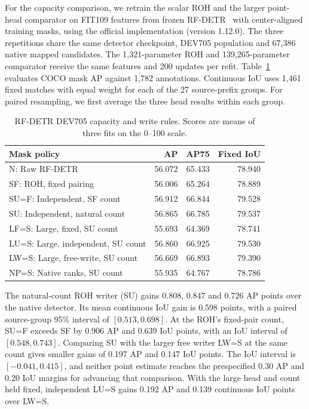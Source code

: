 \documentclass[journal]{IEEEtran}
\begin{document}
For the capacity comparison, we retrain the scalar ROH and the larger point-head comparator on FIT109 features from frozen RF-DETR~\cite{rfdetr} with center-aligned training masks, using the official implementation (version 1.12.0). The three repetitions share the same detector checkpoint, DEV705 population and 67,386 native mapped candidates. The 1,321-parameter ROH and 139,265-parameter comparator receive the same features and 200 updates per refit. Table~\ref{tab:rfdetr} evaluates COCO mask AP against 1,782 annotations. Continuous IoU uses 1,461 fixed matches with equal weight for each of the 27 source-prefix groups. For paired resampling, we first average the three head results within each group.

\begin{table}[t]
\centering
\caption{RF-DETR DEV705 capacity and write rules. Scores are means of three fits on the 0--100 scale.}
\label{tab:rfdetr}
\footnotesize
\begin{tabular}{@{}lrrr@{}}
\toprule
Mask policy & AP & AP75 & Fixed IoU\\
\midrule
N: Raw RF-DETR & 56.072 & 65.433 & 78.940\\
SF: ROH, fixed pairing & 56.006 & 65.264 & 78.889\\
SU=F: Independent, SF count & 56.912 & 66.844 & 79.528\\
SU: Independent, natural count & 56.865 & 66.785 & 79.537\\
LF=S: Large, fixed, SU count & 55.693 & 64.369 & 78.741\\
LU=S: Large, independent, SU count & 56.860 & 66.925 & 79.530\\
LW=S: Large, free-write, SU count & 56.669 & 66.893 & 79.390\\
NP=S: Native ranks, SU count & 55.935 & 64.767 & 78.786\\
\bottomrule
\end{tabular}
\end{table}

The natural-count ROH writer (SU) gains 0.808, 0.847 and 0.726 AP points over the native detector. Its mean continuous IoU gain is 0.598 points, with a paired source-group 95\% interval of \([0.513,0.698]\). At the ROH's fixed-pair count, SU=F exceeds SF by 0.906 AP and 0.639 IoU points, with an IoU interval of \([0.548,0.743]\). Comparing SU with the larger free writer LW=S at the same count gives smaller gains of 0.197 AP and 0.147 IoU points. The IoU interval is \([-0.041,0.415]\), and neither point estimate reaches the prespecified 0.30 AP and 0.20 IoU margins for advancing that comparison. With the large head and count held fixed, independent LU=S gains 0.192 AP and 0.139 continuous IoU points over LW=S.
\end{document}
